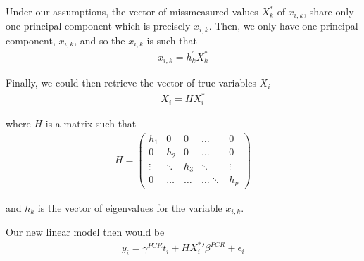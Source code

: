 \documentclass[10pt]{article}
\begin{document}
        Under our assumptions, the vector of missmeasured values $X^*_k$ of $x_{i,k}$, share only one principal component which is precisely $x_{i,k}$. Then, we only have one principal component, $x_{i,k}$, and so the $x_{i,k}$ is such that
        \begin{align}
            x_{i,k}=h_{k}^{\prime} X^*_k
        \end{align}
        
        Finally, we could then retrieve the vector of true variables $X_i$
        \begin{align}
            X_i=HX^*_i
        \end{align}
        
        where $H$ is a matrix such that
        \begin{align*}
            H=\left(\begin{array}{ccccc}
        h_1 & 0 & 0 & \dots & 0 \\
        0 & h_2 & 0 & \dots & 0 \\
        \vdots & \ddots & h_3 & \ddots & \vdots \\
        0 & \dots & \dots & \dots \ddots & h_p
        \end{array}\right)
        \end{align*}
        
        and $h_k$ is the vector of eigenvalues for the variable $x_{i,k}$.
        
        Our new linear model then would be
        \begin{align}
            y_i = \gamma^{PCR} t_i + H{X^*_i}'\beta^{PCR} + \epsilon_i
        \end{align}
        
\end{document}
